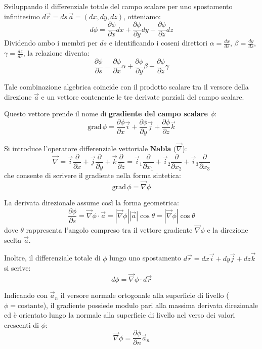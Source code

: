 \documentclass[12pt, a4paper]{article}
\begin{document}
	Sviluppando il differenziale totale del campo scalare per uno spostamento infinitesimo $d\vec{r} = ds \, \vec{a} = (dx, dy, dz)$, otteniamo:
	\[
	d\phi = \frac{\partial \phi}{\partial x} dx + \frac{\partial \phi}{\partial y} dy + \frac{\partial \phi}{\partial z} dz
	\]
	Dividendo ambo i membri per $ds$ e identificando i coseni direttori $\alpha = \frac{dx}{ds}$, $\beta = \frac{dy}{ds}$, $\gamma = \frac{dz}{ds}$, la relazione diventa:
	\[
	\frac{\partial \phi}{\partial s} = \frac{\partial \phi}{\partial x}\alpha + \frac{\partial \phi}{\partial y}\beta + \frac{\partial \phi}{\partial z}\gamma
	\]
	
	Tale combinazione algebrica coincide con il prodotto scalare tra il versore della direzione $\vec{a}$ e un vettore contenente le tre derivate parziali del campo scalare.
	
	Questo vettore prende il nome di \textbf{gradiente del campo scalare $\phi$}:
	\[
	\text{grad}\,\phi = \frac{\partial \phi}{\partial x}\vec{i} + \frac{\partial \phi}{\partial y}\vec{j} + \frac{\partial \phi}{\partial z}\vec{k}
	\]
	
	Si introduce l'operatore differenziale vettoriale \textbf{Nabla} ($\vec{\nabla}$):
	\[
	\vec{\nabla} = \vec{i}\frac{\partial}{\partial x} + \vec{j}\frac{\partial}{\partial y} + \vec{k}\frac{\partial}{\partial z} = \vec{i}_1\frac{\partial}{\partial x_1} + \vec{i}_2\frac{\partial}{\partial x_2} + \vec{i}_3\frac{\partial}{\partial x_3}
	\]
	che consente di scrivere il gradiente nella forma sintetica:
	\[
	\text{grad}\,\phi = \vec{\nabla}\phi
	\]
	
	La derivata direzionale assume così la forma geometrica:
	\[
	\frac{\partial \phi}{\partial s} = \vec{\nabla}\phi \cdot \vec{a} = |\vec{\nabla}\phi| |\vec{a}| \cos\theta = |\vec{\nabla}\phi| \cos\theta
	\]
	dove $\theta$ rappresenta l'angolo compreso tra il vettore gradiente $\vec{\nabla}\phi$ e la direzione scelta $\vec{a}$.
	
	Inoltre, il differenziale totale di $\phi$ lungo uno spostamento $d\vec{r} = dx \vec{i} + dy \vec{j} + dz \vec{k}$ si scrive:
	\[
	d\phi = \vec{\nabla}\phi \cdot d\vec{r}
	\]
	
	Indicando con $\vec{a}_n$ il versore normale ortogonale alla superficie di livello ($\phi = \text{costante}$), il gradiente possiede modulo pari alla massima derivata direzionale ed è orientato lungo la normale alla superficie di livello nel verso dei valori crescenti di $\phi$:
	\[
	\vec{\nabla}\phi = \frac{\partial \phi}{\partial n} \vec{a}_n
	\]
	
\end{document}
